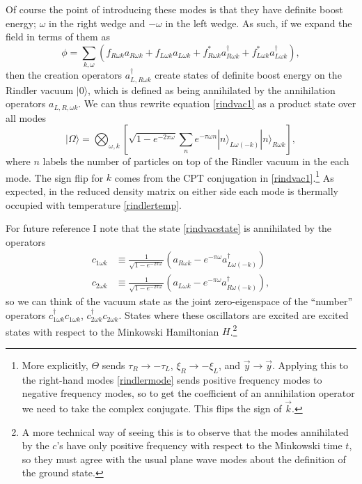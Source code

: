 \documentclass[12pt]{article}
\newcommand{\be}{\begin{equation}}
\newcommand{\ee}{\end{equation}}
\newcommand{\ran}{\rangle}
\begin{document}
Of course the point of introducing these modes is that they have definite boost energy; $\omega$ in the right wedge and $-\omega$ in the left wedge.  As such, if we expand the field in terms of them as
\be
\phi=\sum_{k,\omega}\left(f_{R\omega k}a_{R\omega k}+f_{L\omega k}a_{L\omega k}+f_{R\omega k}^*a_{R\omega k}^\dagger+f^*_{L\omega k}a_{L\omega k}^\dagger\right),
\ee
then the creation operators $a_{L,R \omega k}^\dagger$ create states of definite boost energy on the Rindler vacuum $|0\ran$, which is defined as being annihilated by the annihilation operators $a_{L,R,\omega k}$.  We can thus rewrite equation \eqref{rindvac1} as a product state over all modes
\be\label{rindvacstate}
|\Omega\ran=\bigotimes_{\omega\!,k}\left[\sqrt{1-e^{-2\pi\omega}}\sum_n e^{-\pi \omega n}|n\ran_{L \omega (-k)}|n\ran_{R \omega k}\right],
\ee
where $n$ labels the number of particles on top of the Rindler vacuum in the each mode.  The sign flip for $k$ comes from the CPT conjugation in \eqref{rindvac1}.\footnote{More explicitly, $\Theta$ sends $\tau_R\to-\tau_L$, $\xi_R\to -\xi_L$, and $\vec{y}\to \vec{y}$.  Applying this to the right-hand modes \eqref{rindlermode} sends positive frequency modes to negative frequency modes, so to get the coefficient of an annihilation operator we need to take the complex conjugate.  This flips the sign of $\vec{k}$.}  As expected, in the reduced density matrix on either side each mode is thermally occupied with temperature \eqref{rindlertemp}.  

For future reference I note that the state \eqref{rindvacstate} is annihilated by the operators
\begin{align}\nonumber
c_{1\omega k}&\equiv \frac{1}{\sqrt{1-e^{-2\pi \omega}}}\left(a_{R\omega k}-e^{-\pi \omega} a_{L\omega (-k)}^\dagger\right)\\
c_{2\omega k}&\equiv \frac{1}{\sqrt{1-e^{-2\pi \omega}}}\left(a_{L\omega k}-e^{-\pi \omega} a_{R\omega (-k)}^\dagger\right),\label{cmodes}
\end{align}
so we can think of the vacuum state as the joint zero-eigenspace of the ``number'' operators $c_{1\omega k}^\dagger c_{1\omega k}$, $c_{2\omega k}^\dagger c_{2\omega k}$.  States where these oscillators are excited are excited states with respect to the Minkowski Hamiltonian $H$.\footnote{A more technical way of seeing this is to observe that the modes annihilated by the $c$'s have only positive frequency with respect to the Minkowski time $t$, so they must agree with the usual plane wave modes about the definition of the ground state.}
\end{document}
